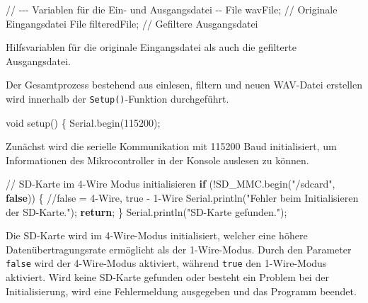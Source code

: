 \documentclass[
  ngerman,
  letterpaper,
  DIV=11]{scrreprt}
\newenvironment{Shaded}{\begin{snugshade}}{\end{snugshade}}
\newcommand{\CommentTok}[1]{\textcolor[rgb]{0.37,0.37,0.37}{#1}}
\newcommand{\ControlFlowTok}[1]{\textcolor[rgb]{0.00,0.23,0.31}{\textbf{#1}}}
\newcommand{\DataTypeTok}[1]{\textcolor[rgb]{0.68,0.00,0.00}{#1}}
\newcommand{\DecValTok}[1]{\textcolor[rgb]{0.68,0.00,0.00}{#1}}
\newcommand{\KeywordTok}[1]{\textcolor[rgb]{0.00,0.23,0.31}{\textbf{#1}}}
\newcommand{\NormalTok}[1]{\textcolor[rgb]{0.00,0.23,0.31}{#1}}
\newcommand{\OperatorTok}[1]{\textcolor[rgb]{0.37,0.37,0.37}{#1}}
\newcommand{\StringTok}[1]{\textcolor[rgb]{0.13,0.47,0.30}{#1}}
\begin{document}
\begin{Shaded}
\begin{Highlighting}[]
\CommentTok{// {-}{-}{-} Variablen für die Ein{-} und Ausgangsdatei {-}{-}}
\NormalTok{File wavFile}\OperatorTok{;}       \CommentTok{// Originale Eingangsdatei}
\NormalTok{File filteredFile}\OperatorTok{;}  \CommentTok{// Gefiltere Ausgangsdatei}
\end{Highlighting}
\end{Shaded}

Hilfsvariablen für die originale Eingangsdatei als auch die gefilterte
Ausgangsdatei.

Der Gesamtprozess bestehend aus einlesen, filtern und neuen WAV-Datei
erstellen wird innerhalb der \texttt{Setup()}-Funktion durchgeführt.

\begin{Shaded}
\begin{Highlighting}[]
\DataTypeTok{void}\NormalTok{ setup}\OperatorTok{()} \OperatorTok{\{}
\NormalTok{  Serial}\OperatorTok{.}\NormalTok{begin}\OperatorTok{(}\DecValTok{115200}\OperatorTok{);}
\end{Highlighting}
\end{Shaded}

Zunächst wird die serielle Kommunikation mit 115200 Baud initialisiert,
um Informationen des Mikrocontroller in der Konsole auslesen zu können.

\begin{Shaded}
\begin{Highlighting}[]
\CommentTok{// SD{-}Karte im 4{-}Wire Modus initialisieren}
\ControlFlowTok{if} \OperatorTok{(!}\NormalTok{SD\_MMC}\OperatorTok{.}\NormalTok{begin}\OperatorTok{(}\StringTok{"/sdcard"}\OperatorTok{,} \KeywordTok{false}\OperatorTok{))} \OperatorTok{\{}  \CommentTok{//false = 4{-}Wire, true {-} 1{-}Wire}
\NormalTok{  Serial}\OperatorTok{.}\NormalTok{println}\OperatorTok{(}\StringTok{"Fehler beim Initialisieren der SD{-}Karte."}\OperatorTok{);}
  \ControlFlowTok{return}\OperatorTok{;}
\OperatorTok{\}}
\NormalTok{Serial}\OperatorTok{.}\NormalTok{println}\OperatorTok{(}\StringTok{"SD{-}Karte gefunden."}\OperatorTok{);}
\end{Highlighting}
\end{Shaded}

Die SD-Karte wird im 4-Wire-Modus initialisiert, welcher eine höhere
Datenübertragungsrate ermöglicht als der 1-Wire-Modus. Durch den
Parameter \texttt{false} wird der 4-Wire-Modus aktiviert, während
\texttt{true} den 1-Wire-Modus aktiviert. Wird keine SD-Karte gefunden
oder besteht ein Problem bei der Initialisierung, wird eine
Fehlermeldung ausgegeben und das Programm beendet.
\end{document}
